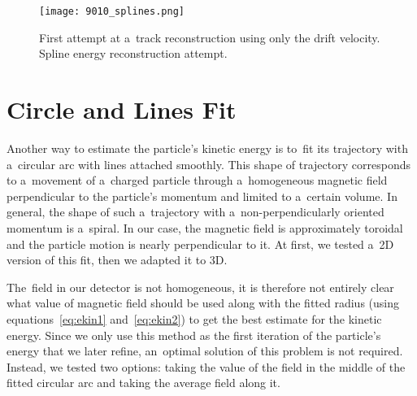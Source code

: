 		\begin{figure}
			\centering
			\texttt{[image: 9010\_splines.png]}
			\caption{First attempt at a~track reconstruction using only the drift velocity. Spline energy reconstruction attempt.}
			\label{fig:9010splines}
		\end{figure}
	
	\section{Circle and Lines Fit}
	\label{sec:clines}
		Another way to estimate the particle's kinetic energy is to~fit its trajectory with a~circular arc with lines attached smoothly. This shape of trajectory corresponds to a~movement of a~charged particle through a~homogeneous magnetic field perpendicular to the particle's momentum and limited to a~certain volume. In general, the shape of such a~trajectory with a~non-perpendicularly oriented momentum is a~spiral. In our case, the magnetic field is approximately toroidal and the particle motion is nearly perpendicular to it. At first, we tested a~2D version of this fit, then we adapted it to 3D.
		
		The~field in our detector is not homogeneous, it is therefore not entirely clear what value of magnetic field should be used along with the fitted radius (using equations~\ref{eq:ekin1} and~\ref{eq:ekin2}) to get the best estimate for the kinetic energy. Since we only use this method as the first iteration of the particle's energy that we later refine, an~optimal solution of this problem is not required. Instead, we tested two options: taking the value of the field in the middle of the fitted circular arc and taking the average field along it.
		

